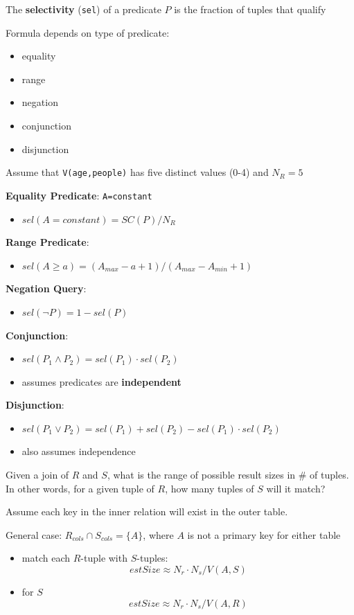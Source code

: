 \documentclass[11pt]{article}
\begin{document}
The \textbf{selectivity} (\texttt{sel}) of a predicate \(P\) is the fraction of tuples that qualify

Formula depends on type of predicate:
\begin{itemize}
\item equality
\item range
\item negation
\item conjunction
\item disjunction
\end{itemize}

Assume that \texttt{V(age,people)} has five distinct values (0-4) and \(N_R=5\)

\textbf{Equality Predicate}: \texttt{A=constant}
\begin{itemize}
\item \(sel(A=constant)=SC(P)/N_R\)
\end{itemize}

\textbf{Range Predicate}:
\begin{itemize}
\item \(sel(A\ge a)=(A_{max}-a+1)/(A_{max}-A_{min}+1)\)
\end{itemize}

\textbf{Negation Query}:
\begin{itemize}
\item \(sel(\neg P)=1-sel(P)\)
\end{itemize}

\textbf{Conjunction}:
\begin{itemize}
\item \(sel(P_1\wedge P_2)=sel(P_1)\cdot sel(P_2)\)
\item assumes predicates are \textbf{independent}
\end{itemize}

\textbf{Disjunction}:
\begin{itemize}
\item \(sel(P_1\vee P_2)=sel(P_1)+sel(P_2)-sel(P_1)\cdot sel(P_2)\)
\item also assumes independence
\end{itemize}

Given a join of \(R\) and \(S\), what is the range of possible result sizes in \# of tuples. In
other words, for a given tuple of \(R\), how many tuples of \(S\) will it match?

Assume each key in the inner relation will exist in the outer table.

General case: \(R_{cols}\cap S_{cols}=\{A\}\), where \(A\) is not a primary key for either table
\begin{itemize}
\item match each \(R\)-tuple with \(S\)-tuples:
\begin{equation*}
estSize\approx N_r\cdot N_s/V(A,S)
\end{equation*}
\item for \(S\)
\begin{equation*}
estSize\approx N_r\cdot N_s/V(A,R)
\end{equation*}
\end{itemize}
\end{document}
